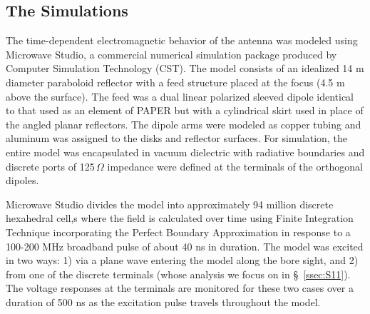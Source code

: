 \documentclass[twocolumn]{emulateapj}
\begin{document}
\subsection{The Simulations}\label{ssec:Simulations}
 The time-dependent electromagnetic behavior of the antenna was modeled using Microwave Studio, a commercial numerical simulation package produced by Computer Simulation Technology (CST).  The model consists of an idealized 14 m diameter paraboloid reflector with a feed structure placed at the focus (4.5 m above the surface). The feed was a dual linear polarized sleeved dipole identical to that used as an element of PAPER but with a cylindrical skirt used in place of the angled planar reflectors.   The dipole arms were modeled as copper tubing and aluminum was assigned to the disks and reflector surfaces.  For simulation, the entire model was encapsulated in vacuum dielectric with radiative boundaries and discrete ports of 125\,$\Omega$ impedance were defined at the terminals of the orthogonal dipoles.

Microwave Studio divides the model into approximately 94 million discrete hexahedral cell,s where the field is calculated over time using Finite Integration Technique incorporating the Perfect Boundary Approximation \citep{CST} in response to a 100-200 MHz broadband pulse of about 40 ns in duration.  The model was excited in two ways: 1) via a plane wave entering the model along the bore sight, and 2) from one of the discrete terminals (whose analysis we focus on in \S~\ref{ssec:S11}).   The voltage responses at the terminals are monitored for these two cases over a duration of 500 ns as the excitation pulse travels throughout the model.
\end{document}
